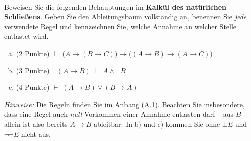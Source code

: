 \newcommand{\printpraesenzlsg}{false}
\newcommand{\printloesungen}{false}
\newcommand{\printbewertungen}{false}
\newcommand{\klausurdatum}{}
\newcommand{\klausurdauer}{2 Stunden}
\newcommand{\klausuraufgaben}{7}
\newcommand{\klausurpunkte}{50}

\usepackage{bussproofs}





\\
Beweisen Sie die folgenden Behauptungen im \textbf{Kalkül des natürlichen Schließens}. Geben Sie den Ableitungsbaum vollständig an, benennen Sie \emph{jede} verwendete Regel und kennzeichnen Sie, welche Annahme an welcher Stelle entlastet wird.
\begin{enumerate}[a)]
  \item (2 Punkte) $\vdash\; \big(A \to (B \to C)\big) \to \big((A \to B) \to (A \to C)\big)$
  \item (3 Punkte) $\neg(A \to B) \;\vdash\; A \wedge \neg B$
  \item (4 Punkte) $\vdash\; (A \to B) \vee (B \to A)$
\end{enumerate}
\textit{Hinweise:} Die Regeln finden Sie im Anhang (A.1). Beachten Sie insbesondere, dass eine Regel auch \emph{null} Vorkommen einer Annahme entlasten darf -- aus $B$ allein ist also bereits $A\to B$ ableitbar. In b) und c) kommen Sie ohne $\bot E$ und $\neg\neg E$ nicht aus.

